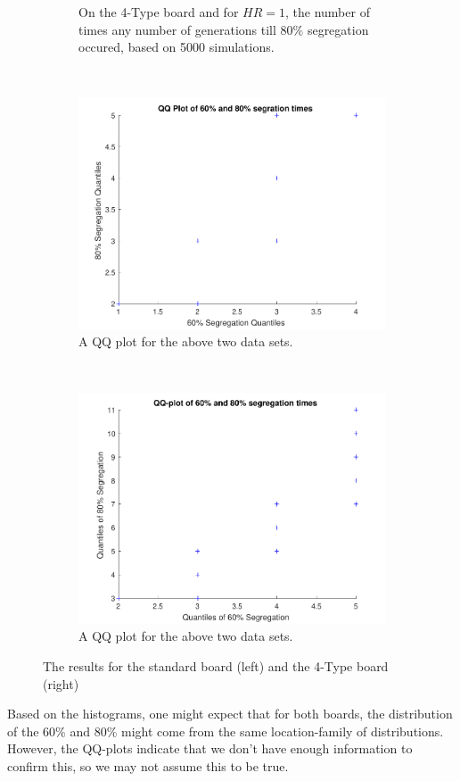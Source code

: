 \begin{figure}[H]
\begin{subfigure}{0.4\textwidth}
    \caption{On the 4-Type board and for $HR=1$, the number of times any number of generations till $80\%$ segregation occured, based on 5000 simulations.}
    \label{fig:segaantgen_480}
\end{subfigure}
~
\begin{subfigure}{0.4\textwidth}
    \centering
    \includegraphics[width=\textwidth]{./60_80_segregation_aantgen/60_80_QQ_plot.pdf}
    \caption{A QQ plot for the above two data sets.}
    \label{fig:qqplotsegaantgen_s}
\end{subfigure}
~
\begin{subfigure}{0.4\textwidth}
    \centering
    \includegraphics[width=\textwidth]{./60_80_segregation_aantgen/4TypeBoard/60_80_QQ_plot.pdf}
    \caption{A QQ plot for the above two data sets.}
    \label{fig:qqplotsegaantgen_4}
\end{subfigure}
\caption{The results for the standard board (left) and the 4-Type board (right)}
\end{figure}
Based on the histograms, one might expect that for both boards, the distribution of the $60\%$ and $80\%$ might come from  the same location-family of distributions. However, the QQ-plots indicate that we don't have enough information to confirm this, so we may not assume this to be true.

